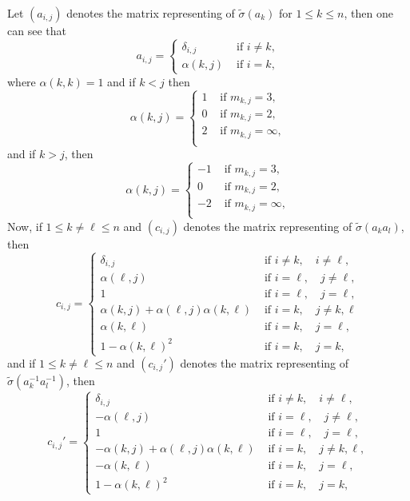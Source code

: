 \documentclass[12pt]{amsart}
\theoremstyle{definition}
\numberwithin{equation}{section}
\begin{document}
 Let $(a_{i,j})$ denotes the matrix representing of $\tilde{\sigma}(a_k)$ for $1 \leq k \leq n$, then one can see that
\begin{equation}\label{small coxeter matrix}
a_{i,j}=\begin{cases}
\delta_{i,j} & \text{ if } i\neq k,\\
\alpha(k,j) & \text{ if } i = k,
\end{cases}
\end{equation}
where $\alpha(k,k)=1$ and  if $k < j$ then $$\alpha(k,j)=\begin{cases}
1 & \text{ if } m_{k,j} = 3, \\
0 & \text{ if } m_{k,j} = 2, \\
2 & \text{ if } m_{k,j} = \infty, \\
\end{cases} 
$$ and if $k>j$, then 
$$\alpha(k,j)=\begin{cases}
-1 & \text{ if } m_{k,j} = 3, \\
0 & \text{ if } m_{k,j} = 2, \\
-2 & \text{ if } m_{k,j} = \infty, \\
\end{cases} 
$$
Now, if $1 \le k\neq \ell \le n$ and $(c_{i,j})$ denotes the matrix representing of $\tilde{\sigma}(a_ka_l)$, then 
\begin{equation}\label{cij}
c_{i,j}=\begin{cases}
    \delta_{i,j} & \text{ if } i\neq k,\quad i\neq \ell,\\
       \alpha(\ell,j) & \text{ if }  i=\ell,\quad j\neq \ell,\\
        1 & \text{ if } i=\ell,\quad j=\ell,\\
        	\alpha(k,j)+ \alpha(\ell,j)\alpha(k,\ell)    & \text{ if } i=k, \quad j\neq k, \ell\\
    \alpha(k,\ell) & \text{ if } i=k,\quad j=\ell,\\
    	1-\alpha(k,\ell)^2    & \text{ if } i=k, \quad j= k,
\end{cases}
\end{equation}
and if $1 \le k\neq \ell \le n$ and $(c_{i,j}')$ denotes the matrix representing of $\tilde{\sigma}(a_k^{-1}a_l^{-1})$, then 
\begin{equation}\label{cij'}
c_{i,j}'=\begin{cases}
    \delta_{i,j} & \text{ if } i\neq k,\quad i\neq \ell,\\
    -\alpha(\ell,j) & \text{ if }  i=\ell,\quad j\neq \ell,\\
        1 & \text{ if } i=\ell,\quad j=\ell,\\
        	-\alpha(k,j)+ \alpha(\ell,j)\alpha(k,\ell)    & \text{ if } i=k, \quad j\neq k, \ell,\\
    -\alpha(k,\ell) & \text{ if } i=k,\quad j=\ell,\\
		1-\alpha(k,\ell)^2    & \text{ if } i=k, \quad j= k,
\end{cases}
\end{equation}
\end{document}
